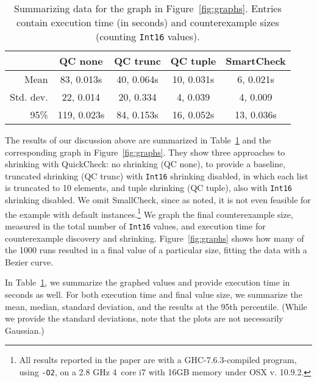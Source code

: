 \documentclass{sigplanconf}
\newcommand{\ttp}[1]{\texttt{#1}}
\begin{document}
\begin{table}[ht]
\footnotesize
  \begin{center}
    \begin{tabular}{|r||c|c|c|c|}
\hline
           & QC none     & QC trunc     & QC tuple    & SmartCheck\\
\hline \hline
Mean       & 83, 0.013s  & 40, 0.064s   & 10, 0.031s  & 6, 0.021s\\
\hline
Std. dev.  & 22, 0.014   & 20, 0.334    & 4,  0.039   & 4, 0.009\\
\hline
95\%       & 119, 0.023s  & 84, 0.153s  & 16, 0.052s  & 13, 0.036s\\
\hline
    \end{tabular}
  \end{center}
  \caption{Summarizing data for the graph in Figure~\ref{fig:graphs}. Entries
    contain execution time (in seconds) and counterexample sizes (counting
    \ttp{Int16} values).}
  \label{table:results}
\end{table}

The results of our discussion above are summarized in Table~\ref{table:results}
and the corresponding graph in Figure~\ref{fig:graphs}. They show three
approaches to shrinking with QuickCheck: no shrinking (QC none), to provide a
baseline, truncated shrinking (QC trunc) with \ttp{Int16} shrinking disabled, in
which each list is truncated to 10 elements, and tuple shrinking (QC tuple),
also with \ttp{Int16} shrinking disabled.  We omit SmallCheck, since as noted,
it is not even feasible for the example with default instances.\footnote{All
  results reported in the paper are with a GHC-7.6.3-compiled program, using
  \ttp{-O2}, on a 2.8 GHz 4~core i7 with 16GB memory under OSX v. 10.9.2.}  We
graph the final counterexample size, measured in the total number of \ttp{Int16}
values, and execution time for counterexample discovery and shrinking.
Figure~\ref{fig:graphs} shows how many of the 1000 runs resulted in a final
value of a particular size, fitting the data with a Bezier curve.

In Table~\ref{table:results}, we summarize the graphed values and provide
execution time in seconds as well.  For both execution time and final value
size, we summarize the mean, median, standard deviation, and the results at the
95th percentile.  (While we provide the standard deviations, note that the plots
are not necessarily Gaussian.)
\end{document}
